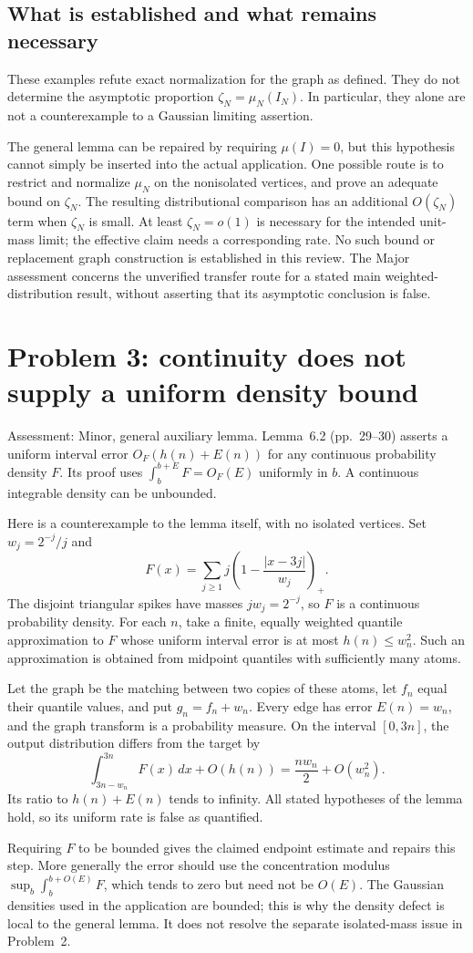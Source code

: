 \documentclass[10pt]{article}
\begin{document}
\subsection*{What is established and what remains necessary}
These examples refute exact normalization for the graph as defined. They do not determine the asymptotic proportion \(\zeta_N=\mu_N(I_N)\). In particular, they alone are not a counterexample to a Gaussian limiting assertion.\par
The general lemma can be repaired by requiring \(\mu(I)=0\), but this hypothesis cannot simply be inserted into the actual application. One possible route is to restrict and normalize \(\mu_N\) on the nonisolated vertices, and prove an adequate bound on \(\zeta_N\). The resulting distributional comparison has an additional \(O(\zeta_N)\) term when \(\zeta_N\) is small. At least \(\zeta_N=o(1)\) is necessary for the intended unit-mass limit; the effective claim needs a corresponding rate. No such bound or replacement graph construction is established in this review. The Major assessment concerns the unverified transfer route for a stated main weighted-distribution result, without asserting that its asymptotic conclusion is false.\par
\section*{Problem 3: continuity does not supply a uniform density bound}
Assessment: Minor, general auxiliary lemma. Lemma 6.2 (pp. 29–30) asserts a uniform interval error \(O_F(h(n)+E(n))\) for any continuous probability density \(F\). Its proof uses \(\int_b^{b+E}F=O_F(E)\) uniformly in \(b\). A continuous integrable density can be unbounded.\par
Here is a counterexample to the lemma itself, with no isolated vertices. Set \(w_j=2^{-j}/j\) and \[F(x)=\sum_{j\ge1}j\left(1-\frac{|x-3j|}{w_j}\right)_+ .\] The disjoint triangular spikes have masses \(jw_j=2^{-j}\), so \(F\) is a continuous probability density. For each \(n\), take a finite, equally weighted quantile approximation to \(F\) whose uniform interval error is at most \(h(n)\le w_n^2\). Such an approximation is obtained from midpoint quantiles with sufficiently many atoms.\par
Let the graph be the matching between two copies of these atoms, let \(f_n\) equal their quantile values, and put \(g_n=f_n+w_n\). Every edge has error \(E(n)=w_n\), and the graph transform is a probability measure. On the interval \([0,3n]\), the output distribution differs from the target by \[\int_{3n-w_n}^{3n}F(x)\,dx+O(h(n))
 =\frac{nw_n}{2}+O(w_n^2).\] Its ratio to \(h(n)+E(n)\) tends to infinity. All stated hypotheses of the lemma hold, so its uniform rate is false as quantified.\par
Requiring \(F\) to be bounded gives the claimed endpoint estimate and repairs this step. More generally the error should use the concentration modulus \(\sup_b\int_b^{b+O(E)}F\), which tends to zero but need not be \(O(E)\). The Gaussian densities used in the application are bounded; this is why the density defect is local to the general lemma. It does not resolve the separate isolated-mass issue in Problem 2.\par
\end{document}
